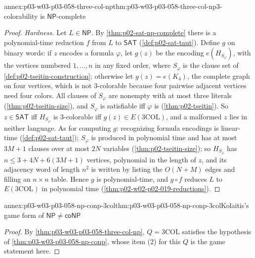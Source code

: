 \begin{annexitem}{annex:p03-w03-p03-058-three-col-np}{thm:p03-w03-p03-058-three-col-np}{3-colorability is \(\mathsf{NP}\)-complete}
\begin{proof}
\emph{Hardness.} Let \(L\in\mathsf{NP}\). By \cref{thm:p02-sat-np-complete}
there is a polynomial-time reduction \(f\) from \(L\) to \(\mathsf{SAT}\)
(\cref{def:p02-sat-taut}). Define \(g\) on binary words: if \(z\) encodes a
formula \(\varphi\), let \(g(z)\) be the encoding \(e(H_{S_\varphi})\), with
the vertices numbered \(1,\ldots,n\) in any fixed order, where
\(S_\varphi\) is the clause set of \cref{def:p02-tseitin-construction};
otherwise let \(g(z)=e(K_4)\), the complete graph on four vertices, which is
not 3-colorable because four pairwise adjacent vertices need four colors. All
clauses of \(S_\varphi\) are nonempty with at most three literals
(\cref{thm:p02-tseitin-size}), and \(S_\varphi\) is satisfiable iff
\(\varphi\) is (\cref{thm:p02-tseitin}). So \(z\in\mathsf{SAT}\) iff
\(H_{S_\varphi}\) is 3-colorable iff \(g(z)\in E(\mathrm{3COL})\), and a
malformed \(z\) lies in neither language. As for computing \(g\): recognizing
formula encodings is linear-time (\cref{def:p02-sat-taut}); \(S_\varphi\) is
produced in polynomial time and has at most \(3M+1\) clauses over at most
\(2N\) variables (\cref{thm:p02-tseitin-size}); so \(H_{S_\varphi}\) has
\(n\le3+4N+6(3M+1)\) vertices, polynomial in the length of \(z\), and its
adjacency word of length \(n^2\) is written by listing the
\(O(N+M)\) edges and filling an \(n\times n\) table. Hence \(g\) is
polynomial-time, and \(g\circ f\) reduces \(L\) to \(E(\mathrm{3COL})\) in
polynomial time (\cref{thm:p02-w02-p02-019-reductions}).
\end{proof}
\end{annexitem}

\begin{annexitem}{annex:p03-w03-p03-058-np-conp-3col}{thm:p03-w03-p03-058-np-conp-3col}{Kolaitis's game form of \(\mathsf{NP}\ne\mathsf{coNP}\)}
\begin{proof}
By \cref{thm:p03-w03-p03-058-three-col-np}, \(Q=\mathrm{3COL}\) satisfies
the hypothesis of \cref{thm:p03-w03-p03-058-np-conp}, whose item (2) for this
\(Q\) is the game statement here.
\end{proof}
\end{annexitem}

